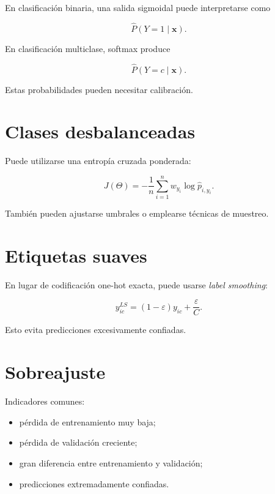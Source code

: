 \documentclass[
  spanish,
  10.5pt,
  letterpaper,
  DIV=11,
  numbers=noendperiod,
  oneside,
  open=any]{scrreprt}
\providecommand{\tightlist}{%
  \setlength{\itemsep}{0pt}\setlength{\parskip}{0pt}}
\theoremstyle{definition}
\theoremstyle{definition}
\theoremstyle{plain}
\theoremstyle{remark}
\begin{document}
En clasificación binaria, una salida sigmoidal puede interpretarse como

\[
\widehat{P}
(Y=1\mid\mathbf{x}).
\]

En clasificación multiclase, softmax produce

\[
\widehat{P}
(Y=c\mid\mathbf{x}).
\]

Estas probabilidades pueden necesitar calibración.

\section*{Clases desbalanceadas}\label{clases-desbalanceadas-3}


Puede utilizarse una entropía cruzada ponderada:

\[
J(\Theta)
=
-
\frac{1}{n}
\sum_{i=1}^{n}
w_{y_i}
\log
\widehat{p}_{i,y_i}.
\]

También pueden ajustarse umbrales o emplearse técnicas de muestreo.

\section*{Etiquetas suaves}\label{etiquetas-suaves}


En lugar de codificación one-hot exacta, puede usarse \emph{label
smoothing}:

\[
y_{ic}^{LS}
=
(1-\varepsilon)y_{ic}
+
\frac{\varepsilon}{C}.
\]

Esto evita predicciones excesivamente confiadas.

\section*{Sobreajuste}\label{sobreajuste-2}


Indicadores comunes:

\begin{itemize}
\tightlist
\item
  pérdida de entrenamiento muy baja;
\item
  pérdida de validación creciente;
\item
  gran diferencia entre entrenamiento y validación;
\item
  predicciones extremadamente confiadas.
\end{itemize}
\end{document}
